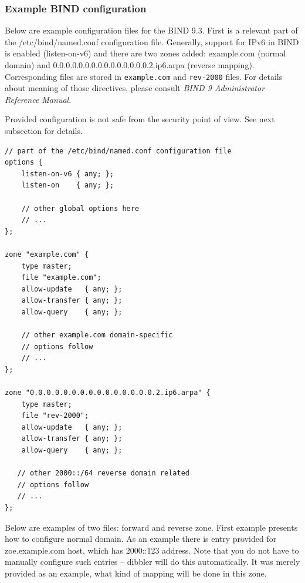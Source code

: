 \subsubsection{Example BIND configuration}
Below are example configuration files for the BIND 9.3. First is a
relevant part of the /etc/bind/named.conf configuration file. Generally,
support for IPv6 in BIND is enabled (listen-on-v6) and there are two
zones added: example.com (normal domain) and
0.0.0.0.0.0.0.0.0.0.0.0.0.0.0.2.ip6.arpa (reverse
mapping). Corresponding files are stored in \verb+example.com+ and
\verb+rev-2000+ files. For details about meaning of those directives,
please consult \emph{BIND 9 Administrator Reference Manual}.

\Note Provided configuration is not safe from the security point of
view. See next subsection for details.
  
\begin{lstlisting}
// part of the /etc/bind/named.conf configuration file
options {
    listen-on-v6 { any; };
    listen-on    { any; };

    // other global options here
    // ...
};

zone "example.com" {
    type master;
    file "example.com";
    allow-update   { any; };
    allow-transfer { any; };
    allow-query    { any; };

    // other example.com domain-specific 
    // options follow
    // ...
};

zone "0.0.0.0.0.0.0.0.0.0.0.0.0.0.0.2.ip6.arpa" {
    type master;
    file "rev-2000";
    allow-update   { any; };
    allow-transfer { any; };
    allow-query    { any; };

   // other 2000::/64 reverse domain related 
   // options follow
   // ...
};
\end{lstlisting}


Below are examples of two files: forward and reverse zone. First example
presents how to configure normal domain. As an example there is entry
provided for zoe.example.com host, which has 2000::123 address. Note
that you do not have to manually configure such entries -- dibbler will
do this automatically. It was merely provided as an example, what kind
of mapping will be done in this zone.

